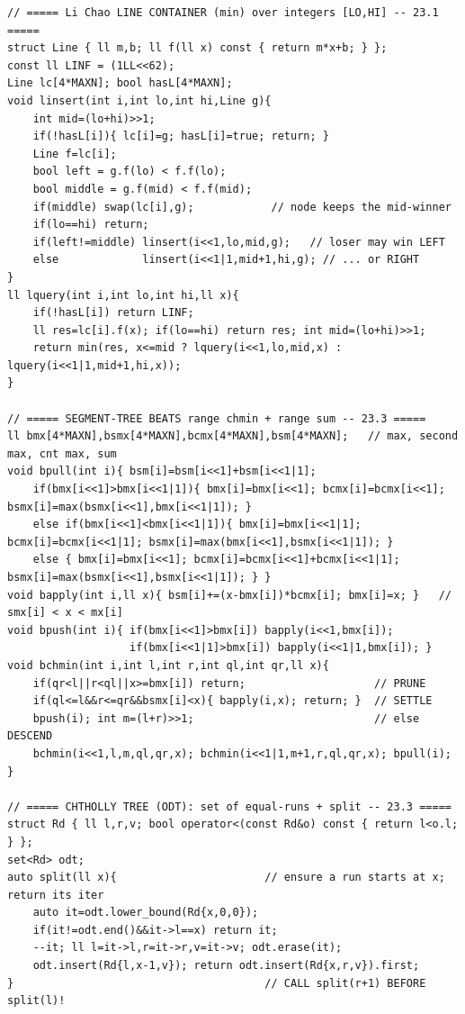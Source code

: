 \begin{lstlisting}[caption={Chapter 23 kit: the Li Chao container, the beats chmin node, the Chtholly split, and the (min,+) matrix composition, one compact skeleton each, in one place}, label={lst:c29-kit}]
// ===== Li Chao LINE CONTAINER (min) over integers [LO,HI] -- 23.1 =====
struct Line { ll m,b; ll f(ll x) const { return m*x+b; } };
const ll LINF = (1LL<<62);
Line lc[4*MAXN]; bool hasL[4*MAXN];
void linsert(int i,int lo,int hi,Line g){
    int mid=(lo+hi)>>1;
    if(!hasL[i]){ lc[i]=g; hasL[i]=true; return; }
    Line f=lc[i];
    bool left = g.f(lo) < f.f(lo);
    bool middle = g.f(mid) < f.f(mid);
    if(middle) swap(lc[i],g);            // node keeps the mid-winner
    if(lo==hi) return;
    if(left!=middle) linsert(i<<1,lo,mid,g);   // loser may win LEFT
    else             linsert(i<<1|1,mid+1,hi,g); // ... or RIGHT
}
ll lquery(int i,int lo,int hi,ll x){
    if(!hasL[i]) return LINF;
    ll res=lc[i].f(x); if(lo==hi) return res; int mid=(lo+hi)>>1;
    return min(res, x<=mid ? lquery(i<<1,lo,mid,x) : lquery(i<<1|1,mid+1,hi,x));
}

// ===== SEGMENT-TREE BEATS range chmin + range sum -- 23.3 =====
ll bmx[4*MAXN],bsmx[4*MAXN],bcmx[4*MAXN],bsm[4*MAXN];   // max, second max, cnt max, sum
void bpull(int i){ bsm[i]=bsm[i<<1]+bsm[i<<1|1];
    if(bmx[i<<1]>bmx[i<<1|1]){ bmx[i]=bmx[i<<1]; bcmx[i]=bcmx[i<<1]; bsmx[i]=max(bsmx[i<<1],bmx[i<<1|1]); }
    else if(bmx[i<<1]<bmx[i<<1|1]){ bmx[i]=bmx[i<<1|1]; bcmx[i]=bcmx[i<<1|1]; bsmx[i]=max(bmx[i<<1],bsmx[i<<1|1]); }
    else { bmx[i]=bmx[i<<1]; bcmx[i]=bcmx[i<<1]+bcmx[i<<1|1]; bsmx[i]=max(bsmx[i<<1],bsmx[i<<1|1]); } }
void bapply(int i,ll x){ bsm[i]+=(x-bmx[i])*bcmx[i]; bmx[i]=x; }   // smx[i] < x < mx[i]
void bpush(int i){ if(bmx[i<<1]>bmx[i]) bapply(i<<1,bmx[i]);
                   if(bmx[i<<1|1]>bmx[i]) bapply(i<<1|1,bmx[i]); }
void bchmin(int i,int l,int r,int ql,int qr,ll x){
    if(qr<l||r<ql||x>=bmx[i]) return;                    // PRUNE
    if(ql<=l&&r<=qr&&bsmx[i]<x){ bapply(i,x); return; }  // SETTLE
    bpush(i); int m=(l+r)>>1;                            // else DESCEND
    bchmin(i<<1,l,m,ql,qr,x); bchmin(i<<1|1,m+1,r,ql,qr,x); bpull(i); }

// ===== CHTHOLLY TREE (ODT): set of equal-runs + split -- 23.3 =====
struct Rd { ll l,r,v; bool operator<(const Rd&o) const { return l<o.l; } };
set<Rd> odt;
auto split(ll x){                       // ensure a run starts at x; return its iter
    auto it=odt.lower_bound(Rd{x,0,0});
    if(it!=odt.end()&&it->l==x) return it;
    --it; ll l=it->l,r=it->r,v=it->v; odt.erase(it);
    odt.insert(Rd{l,x-1,v}); return odt.insert(Rd{x,r,v}).first;
}                                       // CALL split(r+1) BEFORE split(l)!


\end{lstlisting}
